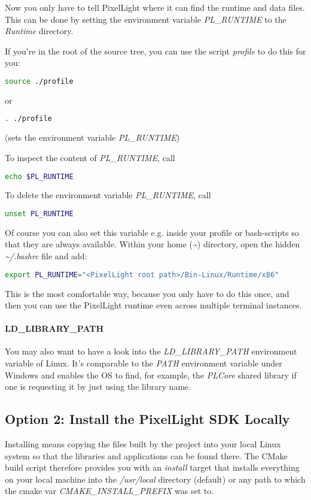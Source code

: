 Now you only have to tell PixelLight where it can find the runtime and data files. This can be done by setting the environment variable \emph{PL\_RUNTIME} to the \emph{Runtime} directory.

If you're in the root of the source tree, you can use the script \emph{profile} to do this for you:
\begin{lstlisting}[language=sh]
source ./profile
\end{lstlisting}
or
\begin{lstlisting}[language=sh]
. ./profile
\end{lstlisting}
(sets the environment variable \emph{PL\_RUNTIME})

To inspect the content of \emph{PL\_RUNTIME}, call
\begin{lstlisting}[language=sh]
echo $PL_RUNTIME
\end{lstlisting}

To delete the environment variable \emph{PL\_RUNTIME}, call
\begin{lstlisting}[language=sh]
unset PL_RUNTIME
\end{lstlisting}

Of course you can also set this variable e.g. inside your profile or bash-scripts so that they are always available. Within your home (\emph{\textasciitilde}) directory, open the hidden \emph{\textasciitilde /.bashrc} file and add:
\begin{lstlisting}[language=sh]
export PL_RUNTIME="<PixelLight root path>/Bin-Linux/Runtime/x86"
\end{lstlisting}
This is the most comfortable way, because you only have to do this once, and then you can use the PixelLight runtime even across multiple terminal instances.


\paragraph{LD\_LIBRARY\_PATH}
You may also want to have a look into the \emph{LD\_LIBRARY\_PATH} environment variable of Linux. It's comparable to the \emph{PATH} environment variable under Windows and enables the \ac{OS} to find, for example, the \emph{PLCore} shared library if one is requesting it by just using the library name.



\subsection{Option 2: Install the PixelLight \ac{SDK} Locally}
Installing means copying the files built by the project into your local Linux system so that the libraries and applications can be found there. The CMake build script therefore provides you with an \emph{install} target that installs everything on your local machine into the \emph{/usr/local} directory (default) or any path to which the cmake var \emph{CMAKE\_INSTALL\_PREFIX} was set to.

